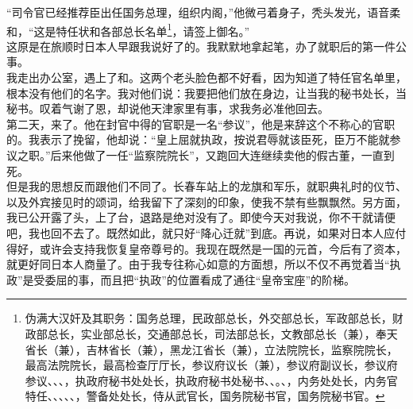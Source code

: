 “司令官已经推荐臣出任国务总理，组织内阁，”他微弓着身子，秃头发光，语音柔和，“这是特任状和各部总长名单\footnote{伪满大汉奸及其职务：国务总理，民政部总长，外交部总长，军政部总长，财政部总长，实业部总长，交通部总长，司法部总长，文教部总长（兼），奉天省长（兼），吉林省长（兼），黑龙江省长（兼），立法院院长，监察院院长，最高法院院长，最高检查厅厅长，参议府议长（兼），参议府副议长，参议府参议、、、，执政府秘书处处长，执政府秘书处秘书、、。、，内务处处长，内务官特任、、、、、，警备处处长，侍从武官长，国务院秘书官，国务院秘书官。}，请签上御名。”\\

这原是在旅顺时日本人早跟我说好了的。我默默地拿起笔，办了就职后的第一件公事。\\

我走出办公室，遇上了和。这两个老头脸色都不好看，因为知道了特任官名单里，根本没有他们的名字。我对他们说：我要把他们放在身边，让当我的秘书处长，当秘书。叹着气谢了恩，却说他天津家里有事，求我务必准他回去。\\

第二天，来了。他在封官中得的官职是一名“参议”，他是来辞这个不称心的官职的。我表示了挽留，他却说：“皇上屈就执政，按说君辱就该臣死，臣万不能就参议之职。”后来他做了一任“监察院院长”，又跑回大连继续卖他的假古董，一直到死。\\

但是我的思想反而跟他们不同了。长春车站上的龙旗和军乐，就职典礼时的仪节、以及外宾接见时的颂词，给我留下了深刻的印象，使我不禁有些飘飘然。另方面，我已公开露了头，上了台，退路是绝对没有了。即使今天对我说，你不干就请便吧，我也回不去了。既然如此，就只好“降心迁就”到底。再说，如果对日本人应付得好，或许会支持我恢复皇帝尊号的。我现在既然是一国的元首，今后有了资本，就更好同日本人商量了。由于我专往称心如意的方面想，所以不仅不再觉着当“执政”是受委屈的事，而且把“执政”的位置看成了通往“皇帝宝座”的阶梯。\\

